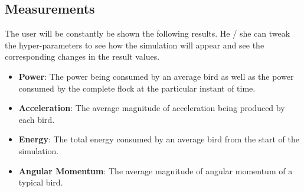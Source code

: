 \documentclass[a4paper,12pt,openany]{book}
\begin{document}
\subsection*{Measurements}
The user will be constantly be shown the following results. He / she can tweak the hyper-parameters to see how the simulation will appear and see the corresponding changes in the result values.
\begin{itemize}
\item \textbf{Power}: The power being consumed by an average bird as well as the power consumed by the complete flock at the particular instant of time.
\item \textbf{Acceleration}: The average magnitude of acceleration being produced by each bird.
\item \textbf{Energy}: The total energy consumed by an average bird from the start of the simulation.
\item \textbf{Angular Momentum}: The average magnitude of angular momentum of a typical bird.
\end{itemize}
\end{document}
